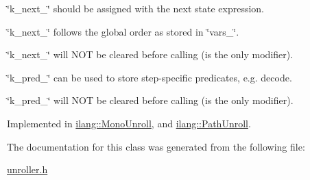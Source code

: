 \begin{DoxyItemize}
\item \char`\"{}k\+\_\+next\+\_\+\char`\"{} should be assigned with the next state expression.
\item \char`\"{}k\+\_\+next\+\_\+\char`\"{} follows the global order as stored in \char`\"{}vars\+\_\+\char`\"{}.
\item \char`\"{}k\+\_\+next\+\_\+\char`\"{} will N\+OT be cleared before calling (is the only modifier).
\item \char`\"{}k\+\_\+pred\+\_\+\char`\"{} can be used to store step-\/specific predicates, e.\+g. decode.
\item \char`\"{}k\+\_\+pred\+\_\+\char`\"{} will N\+OT be cleared before calling (is the only modifier). 
\end{DoxyItemize}

Implemented in \mbox{\hyperlink{classilang_1_1_mono_unroll_a877b2706be77213a5a5f7b50629ba07c}{ilang\+::\+Mono\+Unroll}}, and \mbox{\hyperlink{classilang_1_1_path_unroll_acb62716a4e43a6a3147f664bb6fecaf9}{ilang\+::\+Path\+Unroll}}.



The documentation for this class was generated from the following file\+:\begin{DoxyCompactItemize}
\item 
\mbox{\hyperlink{unroller_8h}{unroller.\+h}}\end{DoxyCompactItemize}
